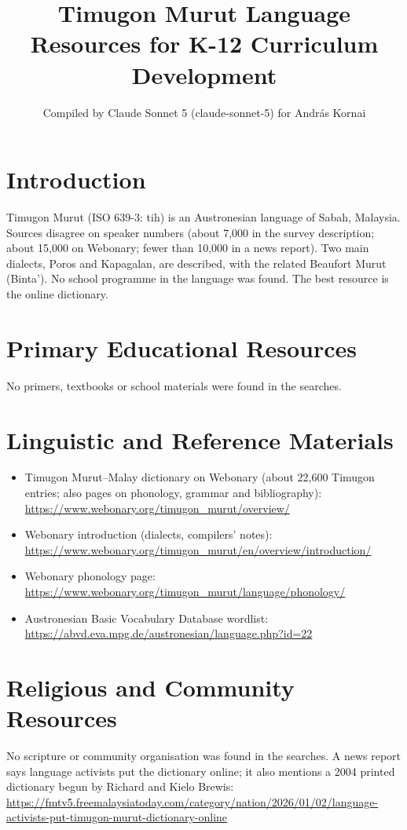 \documentclass[12pt]{article}
\title{Timugon Murut Language Resources for K-12 Curriculum Development}
\author{Compiled by Claude Sonnet 5 (claude-sonnet-5) for Andr\'as Kornai}
\date{}
\begin{document}
\maketitle

\section{Introduction}
Timugon Murut (ISO 639-3: tih) is an Austronesian language of Sabah, Malaysia. Sources disagree on speaker numbers (about 7,000 in the survey description; about 15,000 on Webonary; fewer than 10,000 in a news report). Two main dialects, Poros and Kapagalan, are described, with the related Beaufort Murut (Binta'). No school programme in the language was found. The best resource is the online dictionary.

\section{Primary Educational Resources}
No primers, textbooks or school materials were found in the searches.

\section{Linguistic and Reference Materials}
\begin{itemize}
\item Timugon Murut--Malay dictionary on Webonary (about 22,600 Timugon entries; also pages on phonology, grammar and bibliography): \url{https://www.webonary.org/timugon_murut/overview/}
\item Webonary introduction (dialects, compilers' notes): \url{https://www.webonary.org/timugon_murut/en/overview/introduction/}
\item Webonary phonology page: \url{https://www.webonary.org/timugon_murut/language/phonology/}
\item Austronesian Basic Vocabulary Database wordlist: \url{https://abvd.eva.mpg.de/austronesian/language.php?id=22}
\end{itemize}

\section{Religious and Community Resources}
No scripture or community organisation was found in the searches. A news report says language activists put the dictionary online; it also mentions a 2004 printed dictionary begun by Richard and Kielo Brewis: \url{https://fmtv5.freemalaysiatoday.com/category/nation/2026/01/02/language-activists-put-timugon-murut-dictionary-online}
\end{document}
